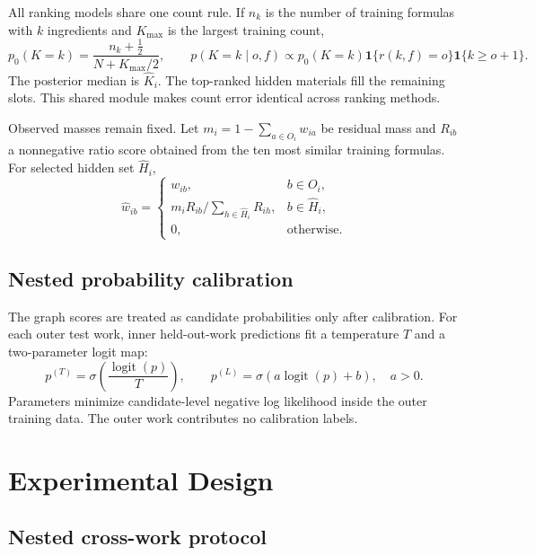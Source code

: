 \documentclass[11pt,a4paper]{article}
\begin{document}
All ranking models share one count rule. If $n_k$ is the number of training formulas with $k$ ingredients and $K_{\max}$ is the largest training count,
\begin{equation}
p_0(K=k)=\frac{n_k+\tfrac12}{N+K_{\max}/2},\qquad
p(K=k\mid o,f)\propto p_0(K=k)\mathbf{1}\{r(k,f)=o\}\mathbf{1}\{k\ge o+1\}.
\label{eq:count}
\end{equation}
The posterior median is $\widehat K_i$. The top-ranked hidden materials fill the remaining slots. This shared module makes count error identical across ranking methods.

Observed masses remain fixed. Let $m_i=1-\sum_{a\in O_i}w_{ia}$ be residual mass and $R_{ib}$ a nonnegative ratio score obtained from the ten most similar training formulas. For selected hidden set $\widehat H_i$,
\begin{equation}
\widehat w_{ib}=
\begin{cases}
w_{ib}, & b\in O_i,\\[2pt]
m_i R_{ib}/\sum_{h\in\widehat H_i}R_{ih}, & b\in\widehat H_i,\\[2pt]
0, & \text{otherwise}.
\end{cases}
\label{eq:composition}
\end{equation}

\subsection{Nested probability calibration}

The graph scores are treated as candidate probabilities only after calibration. For each outer test work, inner held-out-work predictions fit a temperature $T$ and a two-parameter logit map:
\begin{equation}
p^{(T)}=\sigma\!\left(\frac{\operatorname{logit}(p)}{T}\right),\qquad
p^{(L)}=\sigma\!\left(a\operatorname{logit}(p)+b\right),\quad a>0.
\label{eq:calibration}
\end{equation}
Parameters minimize candidate-level negative log likelihood inside the outer training data. The outer work contributes no calibration labels.

\section{Experimental Design}

\subsection{Nested cross-work protocol}
\end{document}
